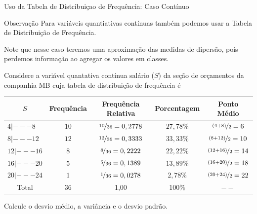 \documentclass[8pt]{beamer}
\begin{document}
\begin{frame}{Uso da Tabela de Distribuiçao de Frequência: Caso Contínuo}
\begin{block}{Observação}
  Para variáveis quantiativas contínuas também podemos usar a Tabela de Distribuição de Frequência. 
  
  Note que nesse caso teremos uma {\color{red} aproximação} das medidas de dipersão, pois perdemos informação ao agregar os valores 
  em classes.
 \end{block}

  Considere a variável quantativa contínua salário ($S$) da seção de orçamentos da companhia MB cuja tabela de distribuição de frequência é 
 
 {\tiny
  \begin{table}
   \centering
   \begin{tabular}{l|ccc|c}
    \toprule[0.05cm]
    \multicolumn{1}{c|}{$S$} & Frequência & Frequência Relativa & Porcentagem & Ponto Médio \\ \midrule[0.05cm]
    $4 |--- 8$ & $10$ & $\nicefrac{10}{36}=0,2778$ & $27,78 \%$ & $\nicefrac{(4+8)}{2} = 6$ \\
    $8 |--- 12$ & $12$ & $\nicefrac{12}{36}=0,3333$ & $33,33 \%$ & $\nicefrac{(8+12)}{2} = 10$\\
    $12 |--- 16$ & $8$ & $\nicefrac{8}{36}=0,2222$ & $22,22 \%$ &  $\nicefrac{(12+16)}{2} = 14$\\
    $16 |--- 20$ & $5$ & $\nicefrac{5}{36}=0,1389$ & $13,89 \%$ & $\nicefrac{(16+20)}{2} = 18$\\
    $20 |--- 24$ & $1$ & $\nicefrac{1}{36}=0,0278$ & $2,78 \%$ & $\nicefrac{(20+24)}{2} = 22$\\ \midrule[0.05cm]
    \multicolumn{1}{c|}{Total} & 36 & 1,00 & 100\% & $--$ \\ \bottomrule[0.05cm]
   \end{tabular}
  \end{table}
 }
 
 Calcule o desvio médio, a variância e o desvio padrão. 
\end{frame}
\end{document}
